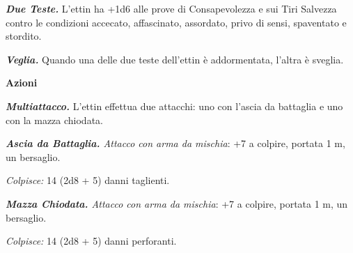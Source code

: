 \begin{multicols}{2}
{\emph{\textbf{Due Teste.}} L'ettin ha +1d6 alle prove di Consapevolezza e sui Tiri Salvezza contro le condizioni accecato, affascinato, assordato, privo di sensi, spaventato e stordito.

\emph{\textbf{Veglia.}} Quando una delle due teste dell'ettin è addormentata, l'altra è sveglia.

\textbf{Azioni}

\emph{\textbf{Multiattacco.}} L'ettin effettua due attacchi: uno con l'ascia da battaglia e uno con la mazza chiodata.

\emph{\textbf{Ascia da Battaglia.} Attacco con arma da mischia}: +7 a colpire, portata 1 m, un bersaglio.

\emph{Colpisce:} 14 (2d8 + 5) danni taglienti.

\emph{\textbf{Mazza Chiodata.} Attacco con arma da mischia}: +7 a colpire, portata 1 m, un bersaglio.

\emph{Colpisce:} 14 (2d8 + 5) danni perforanti.

}
\end{multicols}
